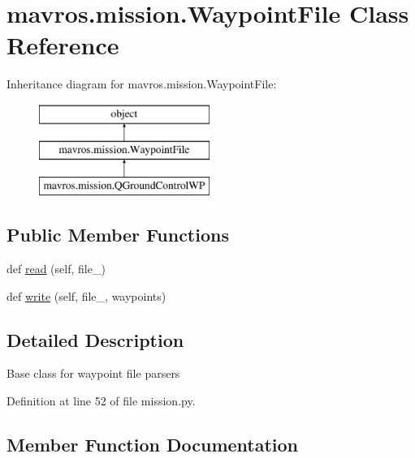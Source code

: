 \hypertarget{classmavros_1_1mission_1_1WaypointFile}{}\section{mavros.\+mission.\+Waypoint\+File Class Reference}
\label{classmavros_1_1mission_1_1WaypointFile}
Inheritance diagram for mavros.\+mission.\+Waypoint\+File\+:\begin{figure}[H]
\begin{center}
\leavevmode
\includegraphics[height=3.000000cm]{classmavros_1_1mission_1_1WaypointFile}
\end{center}
\end{figure}
\subsection*{Public Member Functions}
\begin{DoxyCompactItemize}
\item 
def \mbox{\hyperlink{classmavros_1_1mission_1_1WaypointFile_a36f785a3f53697cb369b6de9afd376d2}{read}} (self, file\+\_\+)
\item 
def \mbox{\hyperlink{classmavros_1_1mission_1_1WaypointFile_a04d4ed37ce9357a0467ef9226296cb49}{write}} (self, file\+\_\+, waypoints)
\end{DoxyCompactItemize}


\subsection{Detailed Description}
\begin{DoxyVerb}Base class for waypoint file parsers\end{DoxyVerb}
 

Definition at line 52 of file mission.\+py.



\subsection{Member Function Documentation}
\mbox{\label{classmavros_1_1mission_1_1WaypointFile_a36f785a3f53697cb369b6de9afd376d2}} 
